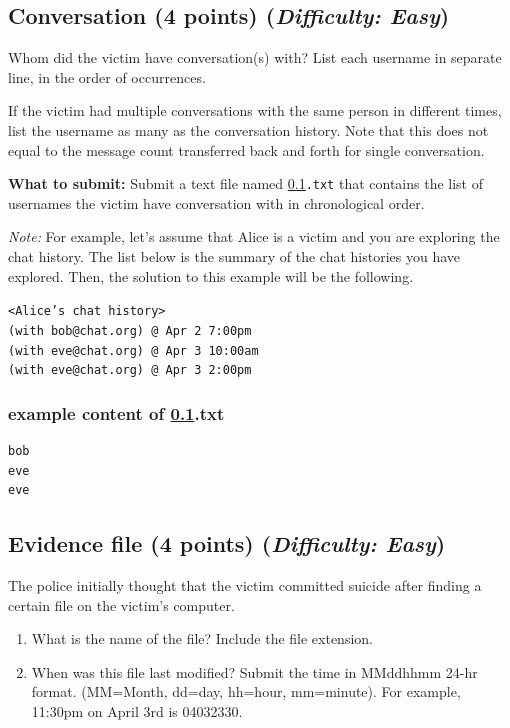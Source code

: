 \documentclass[letterpaper,12pt]{report}
\begin{document}
\subsection{Conversation (4 points)    \hfill\rm\normalsize (\emph{Difficulty: Easy})}
\label{sec:conversation}
Whom did the victim have conversation(s) with? List each username in separate line, in the order of occurrences. 

If the victim had multiple conversations with the same person in different times, list the username as many as the conversation history. Note that this does not equal to the message count transferred back and forth for single conversation.

\medskip 
\textbf{What to submit:} Submit a text file named \texttt{\ref{sec:conversation}.txt} that contains the list of usernames the victim have conversation with in chronological order.

\medskip
\textit{Note:} For example, let's assume that Alice is a victim and you are exploring the chat history. The list below is the summary of the chat histories you have explored. Then, the solution to this example will be the following.
 
\medskip
\texttt{<Alice's chat history>\\
        (with bob@chat.org) @ Apr 2 7:00pm\\
        (with eve@chat.org) @ Apr 3 10:00am\\
        (with eve@chat.org) @ Apr 3 2:00pm}

\subsubsection*{example content of {\ref{sec:conversation}.txt}}
\begin{mdframed}
\begin{Verbatim}
bob
eve
eve
\end{Verbatim}
\end{mdframed}

\subsection{Evidence file (4 points)    \hfill\rm\normalsize (\emph{Difficulty: Easy})}
\label{sec:evidence_file}
The police initially thought that the victim committed suicide after finding a certain file on the victim's computer.

\begin{enumerate}
\item What is the name of the file? Include the file extension.
\item When was this file last modified? Submit the time in MMddhhmm 24-hr format. (MM=Month, dd=day, hh=hour, mm=minute). For example, 11:30pm on April 3rd is 04032330.
\end{enumerate}
\end{document}
